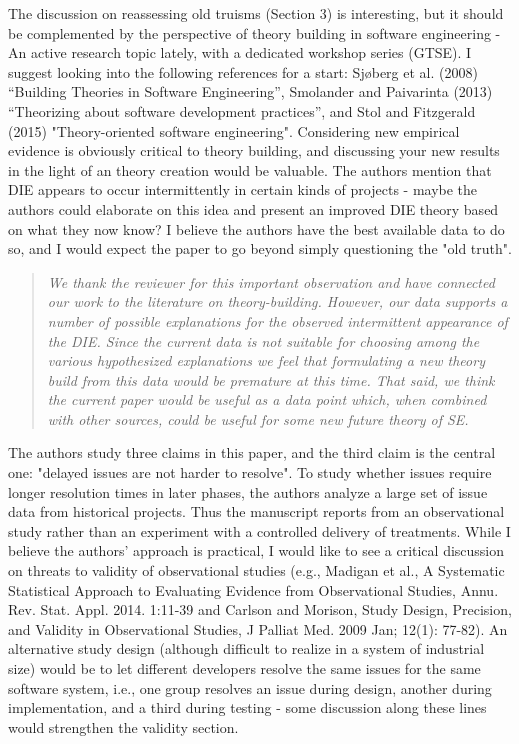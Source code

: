 The discussion on reassessing old truisms (Section 3) is
interesting, but it should be complemented by the
perspective of theory building in software engineering - An
active research topic lately, with a dedicated workshop
series (GTSE). I suggest looking into the following
references for a start: Sj{\o}berg et al. (2008) ``Building
Theories in Software Engineering'', Smolander and Paivarinta
(2013) ``Theorizing about software development practices'',
and Stol and Fitzgerald (2015) "Theory-oriented software
engineering". Considering new empirical evidence is
obviously critical to theory building, and discussing your
new results in the light of an theory creation would be
valuable. The authors mention that DIE appears to occur
intermittently in certain kinds of projects - maybe the
authors could elaborate on this idea and present an improved
DIE theory based on what they now know? I believe the
authors have the best available data to do so, and I would
expect the paper to go beyond simply questioning the "old
truth". 
 
 \begin{quote}{\em 
We thank the reviewer for this important observation and have connected our work to the literature on theory-building. However, our data supports a number of possible explanations for the observed intermittent appearance of the DIE. Since the current data is not suitable for choosing among the various hypothesized explanations we feel that formulating a new theory build from this data
would be premature at this time. That said, we think the current paper would be useful
as a data point which, when combined with other sources, could be useful for some new future theory of SE.
}\end{quote}

The authors study three claims in this paper, and the
third claim is the central one: "delayed issues are not
harder to resolve". To study whether issues require longer
resolution times in later phases, the authors analyze a
large set of issue data from historical projects. Thus the
manuscript reports from an observational study rather than
an experiment with a controlled delivery of treatments.
While I believe the authors' approach is practical, I would
like to see a critical discussion on threats to validity of
observational studies (e.g., Madigan et al., A Systematic
Statistical Approach to Evaluating Evidence from
Observational Studies, Annu. Rev. Stat. Appl. 2014. 1:11-39
and Carlson and Morison, Study Design, Precision, and
Validity in Observational Studies, J Palliat Med. 2009 Jan;
12(1): 77-82). An alternative study design (although
difficult to realize in a system of industrial size) would
be to let different developers resolve the same issues for
the same software system, i.e., one group resolves an issue
during design, another during implementation, and a third
during testing - some discussion along these lines would
strengthen the validity section. 

